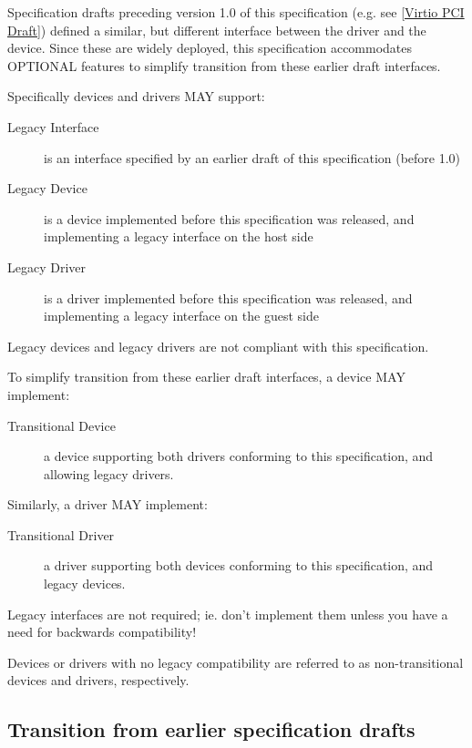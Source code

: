 Specification drafts preceding version 1.0 of this specification
(e.g. see \hyperref[intro:Virtio PCI Draft]{[Virtio PCI Draft]})
defined a similar, but different
interface between the driver and the device.
Since these are widely deployed, this specification
accommodates OPTIONAL features to simplify transition
from these earlier draft interfaces.

Specifically devices and drivers MAY support:
\begin{description}
\item[Legacy Interface]
        is an interface specified by an earlier draft of this specification
        (before 1.0)
\item[Legacy Device]
        is a device implemented before this specification was released,
        and implementing a legacy interface on the host side
\item[Legacy Driver]
        is a driver implemented before this specification was released,
        and implementing a legacy interface on the guest side
\end{description}

Legacy devices and legacy drivers are not compliant with this
specification.

To simplify transition from these earlier draft interfaces,
a device MAY implement:

\begin{description}
\item[Transitional Device]
        a device supporting both drivers conforming to this
        specification, and allowing legacy drivers.
\end{description}

Similarly, a driver MAY implement:
\begin{description}
\item[Transitional Driver]
        a driver supporting both devices conforming to this
        specification, and legacy devices.
\end{description}

\begin{note}
  Legacy interfaces are not required; ie. don't implement them unless you
  have a need for backwards compatibility!
\end{note}

Devices or drivers with no legacy compatibility are referred to as
non-transitional devices and drivers, respectively.

\subsection{Transition from earlier specification drafts}\label{sec:Transition from earlier specification drafts}

